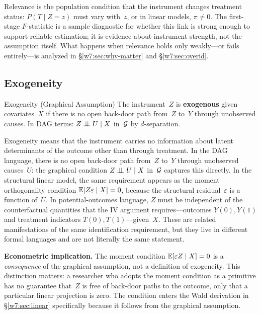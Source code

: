 \documentclass[master.tex]{subfiles}
\begin{document}
Relevance is the population condition that the instrument changes
treatment status: $P(T \mid Z{=}z)$ must vary with~$z$, or in
linear models, $\pi \neq 0$.  The first-stage $F$-statistic is a
sample diagnostic for whether this link is strong enough to support
reliable estimation; it is evidence about instrument strength, not
the assumption itself.  What happens when relevance holds only
weakly---or fails entirely---is analyzed in
\S\ref{w7:sec:why-matter} and \S\ref{w7:sec:overid}.

\subsection{Exogeneity}

\begin{defn}{Exogeneity (Graphical Assumption)}
\label{w7:defn:exogeneity}
The instrument~$Z$ is \textbf{exogenous} given covariates~$X$ if
there is no open back-door path from~$Z$ to~$Y$ through unobserved
causes.  In DAG terms: $Z \perp\!\!\!\perp U \mid X$ in~$\mathcal{G}$ by
$d$-separation.
\end{defn}

\noindent Exogeneity means that the instrument carries no information
about latent determinants of the outcome other than through treatment.
In the DAG language, there is no open back-door path from~$Z$ to~$Y$
through unobserved causes~$U$: the graphical condition $Z \perp\!\!\!\perp U
\mid X$ in~$\mathcal{G}$ captures this directly.  In the structural linear
model, the same requirement appears as the moment orthogonality
condition $\mathbb{E}[Z\varepsilon \mid X] = 0$, because the structural
residual~$\varepsilon$ is a function of~$U$.  In potential-outcomes
language, $Z$ must be independent of the counterfactual quantities
that the IV argument requires---outcomes $Y(0), Y(1)$ and treatment
indicators $T(0), T(1)$---given~$X$.  These are related
manifestations of the same identification requirement, but they live
in different formal languages and are not literally the same
statement.

\noindent\textbf{Econometric implication.}  The moment condition
$\mathbb{E}[\varepsilon Z \mid X] = 0$ is a \emph{consequence} of the
graphical assumption, not a definition of exogeneity.  This
distinction matters: a researcher who adopts the moment condition as
a primitive has no guarantee that~$Z$ is free of back-door paths to
the outcome, only that a particular linear projection is zero.
The condition enters the Wald derivation in \S\ref{w7:sec:linear}
specifically because it follows from the graphical assumption.
\end{document}
